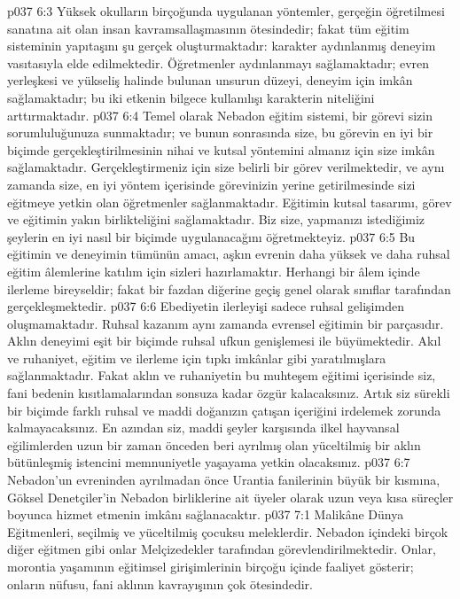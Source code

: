 \vs p037 6:3 Yüksek okulların birçoğunda uygulanan yöntemler, gerçeğin öğretilmesi sanatına ait olan insan kavramsallaşmasının ötesindedir; fakat tüm eğitim sisteminin yapıtaşını şu gerçek oluşturmaktadır: karakter aydınlanmış deneyim vasıtasıyla elde edilmektedir. Öğretmenler aydınlanmayı sağlamaktadır; evren yerleşkesi ve yükseliş halinde bulunan unsurun düzeyi, deneyim için imkân sağlamaktadır; bu iki etkenin bilgece kullanılışı karakterin niteliğini arttırmaktadır.
\vs p037 6:4 Temel olarak Nebadon eğitim sistemi, bir görevi sizin sorumluluğunuza sunmaktadır; ve bunun sonrasında size, bu görevin en iyi bir biçimde gerçekleştirilmesinin nihai ve kutsal yöntemini almanız için size imkân sağlamaktadır. Gerçekleştirmeniz için size belirli bir görev verilmektedir, ve aynı zamanda size, en iyi yöntem içerisinde görevinizin yerine getirilmesinde sizi eğitmeye yetkin olan öğretmenler sağlanmaktadır. Eğitimin kutsal tasarımı, görev ve eğitimin yakın birlikteliğini sağlamaktadır. Biz size, yapmanızı istediğimiz şeylerin en iyi nasıl bir biçimde uygulanacağını öğretmekteyiz.
\vs p037 6:5 Bu eğitimin ve deneyimin tümünün amacı, aşkın evrenin daha yüksek ve daha ruhsal eğitim âlemlerine katılım için sizleri hazırlamaktır. Herhangi bir âlem içinde ilerleme bireyseldir; fakat bir fazdan diğerine geçiş genel olarak sınıflar tarafından gerçekleşmektedir.
\vs p037 6:6 Ebediyetin ilerleyişi sadece ruhsal gelişimden oluşmamaktadır. Ruhsal kazanım aynı zamanda evrensel eğitimin bir parçasıdır. Aklın deneyimi eşit bir biçimde ruhsal ufkun genişlemesi ile büyümektedir. Akıl ve ruhaniyet, eğitim ve ilerleme için tıpkı imkânlar gibi yaratılmışlara sağlanmaktadır. Fakat aklın ve ruhaniyetin bu muhteşem eğitimi içerisinde siz, fani bedenin kısıtlamalarından sonsuza kadar özgür kalacaksınız. Artık siz sürekli bir biçimde farklı ruhsal ve maddi doğanızın çatışan içeriğini irdelemek zorunda kalmayacaksınız. En azından siz, maddi şeyler karşısında ilkel hayvansal eğilimlerden uzun bir zaman önceden beri ayrılmış olan yüceltilmiş bir aklın bütünleşmiş istencini memnuniyetle yaşayama yetkin olacaksınız.
\vs p037 6:7 Nebadon’un evreninden ayrılmadan önce Urantia fanilerinin büyük bir kısmına, Göksel Denetçiler’in Nebadon birliklerine ait üyeler olarak uzun veya kısa süreçler boyunca hizmet etmenin imkânı sağlanacaktır.
\vs p037 7:1 Malikâne Dünya Eğitmenleri, seçilmiş ve yüceltilmiş çocuksu meleklerdir. Nebadon içindeki birçok diğer eğitmen gibi onlar Melçizedekler tarafından görevlendirilmektedir. Onlar, morontia yaşamının eğitimsel girişimlerinin birçoğu içinde faaliyet gösterir; onların nüfusu, fani aklının kavrayışının çok ötesindedir.
